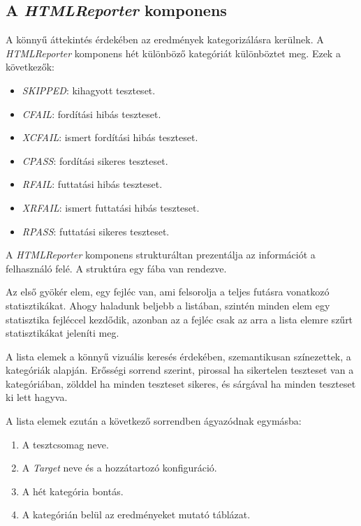     \subsection{A \textit{HTMLReporter} komponens}

        A könnyű áttekintés érdekében az eredmények kategorizálásra kerülnek. A \textit{HTMLReporter} komponens hét
        különböző kategóriát különböztet meg. Ezek a következők:

        \begin{itemize}
            \item \textit{SKIPPED}: kihagyott teszteset.
            \item \textit{CFAIL}: fordítási hibás teszteset.
            \item \textit{XCFAIL}: ismert fordítási hibás teszteset.
            \item \textit{CPASS}: fordítási sikeres teszteset.
            \item \textit{RFAIL}: futtatási hibás teszteset.
            \item \textit{XRFAIL}: ismert futtatási hibás teszteset.
            \item \textit{RPASS}: futtatási sikeres teszteset.
        \end{itemize}

        A \textit{HTMLReporter} komponens strukturáltan prezentálja az információt a felhasználó felé. A struktúra egy
        fába van rendezve.

        Az első gyökér elem, egy fejléc van, ami felsorolja a teljes futásra vonatkozó statisztikákat. Ahogy haladunk
        beljebb a listában, szintén minden elem egy statisztika fejléccel kezdődik, azonban az a fejléc csak az arra a
        lista elemre szűrt statisztikákat jeleníti meg.

        A lista elemek a könnyű vizuális keresés érdekében, szemantikusan színezettek, a kategóriák alapján. Erősségi
        sorrend szerint, pirossal ha sikertelen teszteset van a kategóriában, zölddel ha minden teszteset sikeres, és
        sárgával ha minden teszteset ki lett hagyva.

        A lista elemek ezután a következő sorrendben ágyazódnak egymásba:

        \begin{enumerate}
            \item A tesztcsomag neve.
            \item A \textit{Target} neve és a hozzátartozó konfiguráció.
            \item A hét kategória bontás.
            \item A kategórián belül az eredményeket mutató táblázat.
        \end{enumerate}

